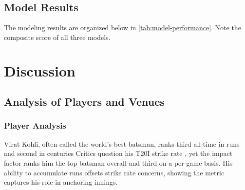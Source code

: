 \documentclass{article}[12pt]
\newcommand{\Autoref}[1]{\autoref{#1}}
\begin{document}
\subsection{Model Results}
The modeling results are organized below in \Autoref{tab:model-performance}. Note the composite score of all three models.
\begin{table}[!h]
\centering
{}
\caption{Model performance based on mean accuracy and 95\% confidence intervals over 30 iterations}
\label{tab:model-performance}
\end{table}



\section{Discussion} \label{sec:discussion}

\subsection{Analysis of Players and Venues}



\subsubsection{Player Analysis}

Virat Kohli, often called the world’s best batsman, ranks third all-time in runs and second in centuries \parencite{espn_2025_espncricinfo2} Critics question his T20I strike rate \parencite{toisportsdesk_2024_usually}, yet the impact factor ranks him the top batsman overall and third on a per-game basis. His ability to accumulate runs offsets strike rate concerns, showing the metric captures his role in anchoring innings.
\end{document}
